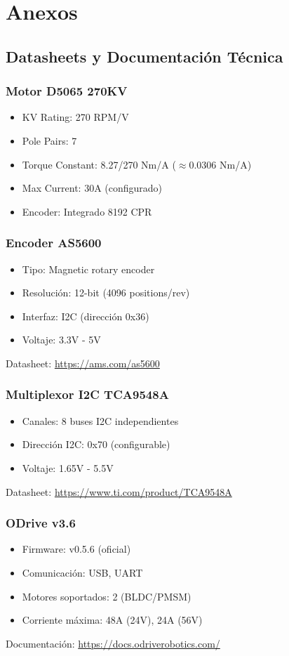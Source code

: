 \chapter{Anexos}

\section{Datasheets y Documentación Técnica}

\subsection{Motor D5065 270KV}
\begin{itemize}
    \item KV Rating: 270 RPM/V
    \item Pole Pairs: 7
    \item Torque Constant: 8.27/270 Nm/A ($\approx$0.0306 Nm/A)
    \item Max Current: 30A (configurado)
    \item Encoder: Integrado 8192 CPR
\end{itemize}

\subsection{Encoder AS5600}
\begin{itemize}
    \item Tipo: Magnetic rotary encoder
    \item Resolución: 12-bit (4096 positions/rev)
    \item Interfaz: I2C (dirección 0x36)
    \item Voltaje: 3.3V - 5V
\end{itemize}
Datasheet: \url{https://ams.com/as5600}

\subsection{Multiplexor I2C TCA9548A}
\begin{itemize}
    \item Canales: 8 buses I2C independientes
    \item Dirección I2C: 0x70 (configurable)
    \item Voltaje: 1.65V - 5.5V
\end{itemize}
Datasheet: \url{https://www.ti.com/product/TCA9548A}

\subsection{ODrive v3.6}
\begin{itemize}
    \item Firmware: v0.5.6 (oficial)
    \item Comunicación: USB, UART
    \item Motores soportados: 2 (BLDC/PMSM)
    \item Corriente máxima: 48A (24V), 24A (56V)
\end{itemize}
Documentación: \url{https://docs.odriverobotics.com/}

